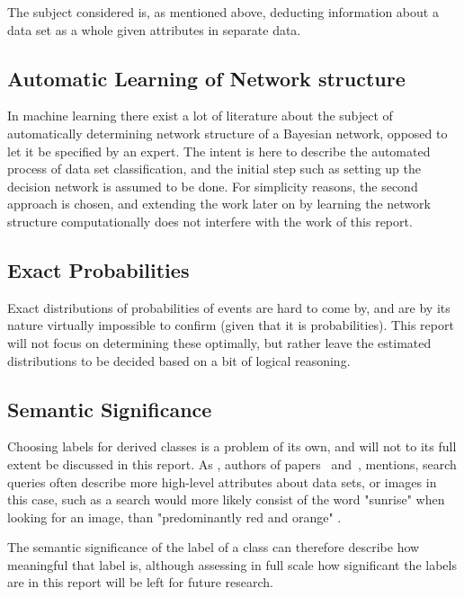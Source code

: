 The subject considered is, as mentioned above, deducting 
information about a data set as a whole given attributes in 
separate data.

\subsection{Automatic Learning of Network structure}
In machine learning there exist a lot of literature about the
subject of automatically determining network structure of 
a Bayesian network, opposed to let it be specified by an
expert. The intent is here to describe the automated process
of data set classification, and the initial step such as 
setting up the decision network is assumed to be done. For 
simplicity reasons, the second approach is chosen, and 
extending the work later on by learning the network structure
computationally does not interfere with the work of this 
report.

\subsection{Exact Probabilities}
Exact distributions of probabilities of events are hard to 
come by, and are by its nature virtually impossible to 
confirm (given that it is probabilities). This report will not
focus on determining these optimally, but rather leave the 
estimated distributions to be decided based on a bit of logical
reasoning. 

\subsection{Semantic Significance}
Choosing labels for derived classes is a problem of its own, and
will not to its full extent be discussed in this report. As 
\citeauthor{content-based-classification}, authors of 
papers~ 
and~,
mentions, search queries often describe more high-level attributes
about data sets, or images in this case, such as a search would more
likely consist of the word "sunrise" when looking for an image, than
"predominantly red and orange" 
\cite{framework-classification, content-based-classification}.

The semantic significance of the label of a class can therefore 
describe how meaningful that label is, although assessing in full 
scale how significant the labels are in this report will be left 
for future research.
